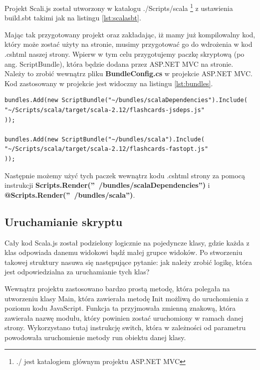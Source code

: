 Projekt Scali.js został utworzony w katalogu ./Scripts/scala \footnote{./ jest katalogiem głównym projektu ASP.NET MVC} z ustawienia build.sbt takimi jak na listingu \ref{lst:scalasbt}.

Mając tak przygotowany projekt oraz zakładając, iż mamy już kompilowalny kod, który może zostać użyty na stronie, musimy przygotować go do wdrożenia w kod .cshtml naszej strony. Wpierw w tym celu przygotujemy paczkę skryptową (po ang. ScriptBundle), która będzie dodana przez ASP.NET MVC na stronie.
Należy to zrobić wewnątrz pliku \textbf{BundleConfig.cs} w projekcie ASP.NET MVC. Kod zastosowany w projekcie jest widoczny na listingu \ref{lst:bundles}.

\begin{minipage}{\linewidth}
\begin{lstlisting}[label=lst:bundles,
frame=single, numbers=none,captionpos=b, 
caption={Dodanie paczek ze skryptami dla BundleConfig.}]
bundles.Add(new ScriptBundle("~/bundles/scalaDependencies").Include(
"~/Scripts/scala/target/scala-2.12/flashcards-jsdeps.js"
));

bundles.Add(new ScriptBundle("~/bundles/scala").Include(
"~/Scripts/scala/target/scala-2.12/flashcards-fastopt.js"
));
\end{lstlisting}
\end{minipage}

Następnie możemy użyć tych paczek wewnątrz kodu .cshtml strony za pomocą instrukcji \textbf{Scripts.Render(''~/bundles/scalaDependencies'')} i \textbf{@Scripts.Render(''~/bundles/scala'')}.

\subsection{Uruchamianie skryptu}

Cały kod Scala.js został podzielony logicznie na pojedyncze klasy, gdzie każda z klas odpowiada danemu widokowi bądź małej grupce widoków. Po stworzeniu takowej struktury nasuwa się następujące pytanie: jak należy zrobić logikę, która jest odpowiedzialna za uruchamianie tych klas?

Wewnątrz projektu zastosowano bardzo prostą metodę, która polegała na utworzeniu klasy Main, która zawierała metodę Init możliwą do uruchomienia z poziomu kodu JavaScript. Funkcja ta przyjmowała zmienną znakową, która zawierała nazwę modułu, który powinien zostać uruchomiony w ramach danej strony. Wykorzystano tutaj instrukcję switch, która w zależności od parametru powodowała uruchomienie metody run obiektu danej klasy.

